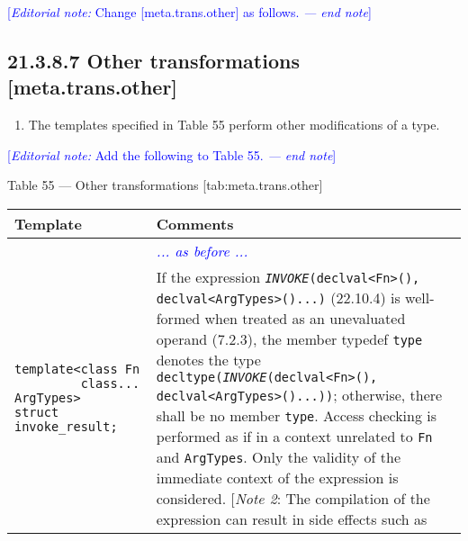 \documentclass{article}
\begin{document}
\textcolor{blue}{[\textit{Editorial note:} Change [meta.trans.other] as follows. \textit{--- end note}]}

\subsection{21.3.8.7 Other transformations [meta.trans.other]}

\begin{enumerate}
\item The templates specified in Table 55 perform other modifications of a type.
\end{enumerate}

\textcolor{blue}{[\textit{Editorial note:} Add the following to Table 55. \textit{--- end note}]}
  
\begin{center}
  Table 55 — Other transformations [tab:meta.trans.other]
  \begin{tabular}[t]{ | p{6cm} p{12cm} | }
    \hline
    Template & Comments \\ 
    \hline\hline
    & \textcolor{blue}{\textit{... as before ...}} \\
    \hline
    \makecell[l]{\texttt{template<class Fn} \\
                 \texttt{\ \ \ \ \ \ \ \ \ class... ArgTypes>} \\
                 \texttt{struct invoke\_result;}} &
    \makecell[l]{If the expression \texttt{\textit{INVOKE}(declval<Fn>(),} \\
                 \texttt{declval<ArgTypes>()...)} (22.10.4) is well-formed when treated as \\
                 an unevaluated operand (7.2.3), the member typedef \texttt{type} denotes \\
                 the type \texttt{decltype(\textit{INVOKE}(declval<Fn>(),} \\
                 \texttt{declval<ArgTypes>()...))}; otherwise, there shall be no member \\
                 \texttt{type}. Access checking is performed as if in a context unrelated to \texttt{Fn} \\
                 and \texttt{ArgTypes}. Only the validity of the immediate context of the \\
                 expression is considered. \\
                 $[$\textit{Note 2}: The compilation of the expression can result in side effects such as \\
}
\end{tabular}
\end{center}
\end{document}

